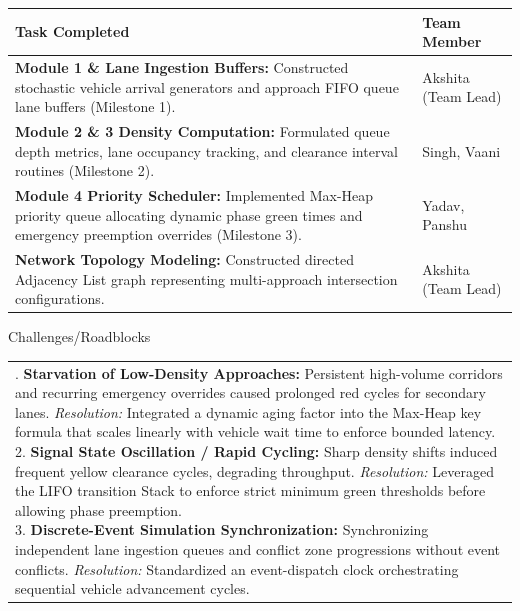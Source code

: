 \documentclass[12pt,a4paper]{article}
\newcommand{\sectiontitle}[1]{%
    {\color{GEUBlue}
    \fontsize{16.5}{20}\selectfont #1}
}
\newcommand{\instruction}[1]{%
    {\color{InstructionGrey}
    \fontsize{9.5}{12}\selectfont #1}
}
\newcommand{\answerbox}[2]{%
    \noindent
    \begin{tabularx}{\textwidth}{
        |>{\raggedright\arraybackslash}X|}
        \hline
        \parbox[t][#1][t]{\dimexpr\linewidth-12pt\relax}{
            \vspace{4pt}
            \fontsize{10}{13.5}\selectfont #2
        }\\
        \hline
    \end{tabularx}
}
\begin{document}
\begin{tabularx}{\textwidth}{
|>{\raggedright\arraybackslash}p{}
|>{\raggedright\arraybackslash}X|
}
\hline
\textbf{Task Completed} & \textbf{Team Member}\\
\hline
\textbf{Module 1 \& Lane Ingestion Buffers:} Constructed stochastic vehicle arrival generators and approach FIFO queue lane buffers (Milestone 1). & Akshita (Team Lead) \\
\hline
\textbf{Module 2 \& 3 Density Computation:} Formulated queue depth metrics, lane occupancy tracking, and clearance interval routines (Milestone 2). & Singh, Vaani \\
\hline
\textbf{Module 4 Priority Scheduler:} Implemented Max-Heap priority queue allocating dynamic phase green times and emergency preemption overrides (Milestone 3). & Yadav, Panshu \\
\hline
\textbf{Network Topology Modeling:} Constructed directed Adjacency List graph representing multi-approach intersection configurations. & Akshita (Team Lead) \\
\hline
\end{tabularx}

\vspace{0.40cm}

\sectiontitle{Challenges/Roadblocks}

\vspace{0.03cm}

\instruction{

}

\vspace{0.15cm}

\answerbox{4.80cm}{1. \textbf{Starvation of Low-Density Approaches:} Persistent high-volume corridors and recurring emergency overrides caused prolonged red cycles for secondary lanes. \textit{Resolution:} Integrated a dynamic aging factor into the Max-Heap key formula that scales linearly with vehicle wait time to enforce bounded latency.\\[3pt]
2. \textbf{Signal State Oscillation / Rapid Cycling:} Sharp density shifts induced frequent yellow clearance cycles, degrading throughput. \textit{Resolution:} Leveraged the LIFO transition Stack to enforce strict minimum green thresholds before allowing phase preemption.\\[3pt]
3. \textbf{Discrete-Event Simulation Synchronization:} Synchronizing independent lane ingestion queues and conflict zone progressions without event conflicts. \textit{Resolution:} Standardized an event-dispatch clock orchestrating sequential vehicle advancement cycles.}
\end{document}
